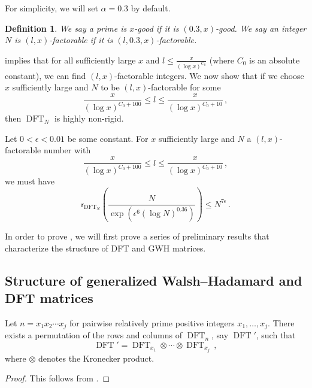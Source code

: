 \documentclass{toc}
\newtheorem{define}[theorem]{Definition}
\DeclareMathOperator{\DFT}{DFT}
\begin{document}
For simplicity, we will set $\alpha = 0.3$ by default. 
\begin{define}
%
We say a prime is $x$-good %
if it is $(0.3,x)$-good.  %
We say an integer $N$ is %
 $(l,x)$-factorable if it is $(l, 0.3, x)$-factorable.
\end{define}  

 implies that for all sufficiently large $x$ and $l \leq \frac{x}{(\log x)^{C_0}}$ (where $C_0$ is an absolute constant), we can find $(l,x)$-factorable integers.  We now show that if we choose $x$ sufficiently large and $N$ to be $(l,x)$-factorable for some 
\[
\frac{x}{(\log x)^{C_0 + 100}} \leq l \leq\frac{x}{(\log x)^{C_0 + 10}} \,, \]
 then %
$\DFT_N$ %
 is highly non-rigid.  


\begin{theorem} \label{main}
Let $0 <\epsilon < 0.01$ be some constant.  For $x$ sufficiently large and $N$ a $(l, x)$-factorable number with \[\frac{x}{(\log x)^{C_0 + 100}} \leq l \leq\frac{x}{(\log x)^{C_0 + 10}}\,, \] we must have
%
%
%
%
\[
\textsf{r}_{\DFT_N}\left( \frac{N}{\exp\left(\epsilon^6 (\log N)^{0.36}\right)} \right) \leq N^{ 7 \epsilon} \,.
\]
%
\end{theorem}

In order to prove , we will first prove a series of preliminary results that characterize the structure of %
DFT %
 and 
%
GWH matrices.   %

%
\subsection{Structure of generalized Walsh--Hadamard and %
DFT %
 matrices}

\begin{lemma}\label{decomp}
Let $n = x_1x_2\cdots x_j$ for pairwise relatively prime positive integers $x_1, \dots , x_j$. There exists a permutation of the rows and columns of
$\DFT_n$, say $\DFT'$, such that 
\[
\DFT' = \DFT_{x_1} \otimes \cdots \otimes \DFT_{x_j}\,,
\]
where $\otimes$ denotes the Kronecker product.
\end{lemma}
\begin{proof}
This follows from .
\end{proof}
\end{document}
